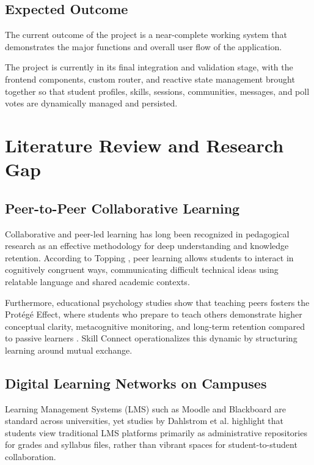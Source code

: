 \documentclass[12pt,a4paper]{report}
\begin{document}
\section{Expected Outcome}
The current outcome of the project is a near-complete working system that demonstrates the major functions and overall user flow of the application.

The project is currently in its final integration and validation stage, with the frontend components, custom router, and reactive state management brought together so that student profiles, skills, sessions, communities, messages, and poll votes are dynamically managed and persisted.

\newpage
\chapter{Literature Review and Research Gap}

\section{Peer-to-Peer Collaborative Learning}
Collaborative and peer-led learning has long been recognized in pedagogical research as an effective methodology for deep understanding and knowledge retention. According to Topping \cite{topping2005trends}, peer learning allows students to interact in cognitively congruent ways, communicating difficult technical ideas using relatable language and shared academic contexts.

Furthermore, educational psychology studies show that teaching peers fosters the Prot\'eg\'e Effect, where students who prepare to teach others demonstrate higher conceptual clarity, metacognitive monitoring, and long-term retention compared to passive learners \cite{nestojko2014expecting}. Skill Connect operationalizes this dynamic by structuring learning around mutual exchange.

\section{Digital Learning Networks on Campuses}
Learning Management Systems (LMS) such as Moodle and Blackboard are standard across universities, yet studies by Dahlstrom et al. \cite{dahlstrom2014study} highlight that students view traditional LMS platforms primarily as administrative repositories for grades and syllabus files, rather than vibrant spaces for student-to-student collaboration.
\end{document}
